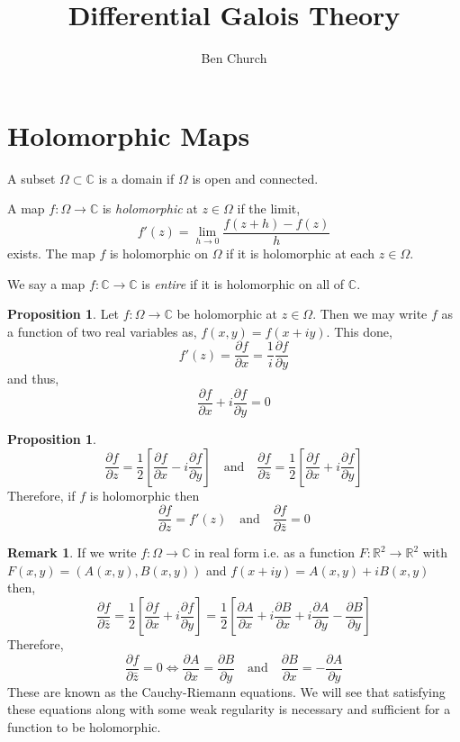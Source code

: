 \documentclass[12pt]{extarticle}
\newcommand{\R}{\mathbb{R}}
\newcommand{\C}{\mathbb{C}}
\newcommand{\pderiv}[2]{\frac{\partial{#1}}{\partial{#2}}}
\theoremstyle{definition}
\newtheorem{proposition}[theorem]{Proposition}
\newtheorem{remark}{Remark}
\newenvironment{definition}[1][Definition:]{\begin{trivlist}
\item[\hskip \labelsep {\bfseries #1}]}{\end{trivlist}}
\begin{document}
\title{Differential Galois Theory}
\author{Ben Church}
\maketitle
\tableofcontents
\newpage

\section{Holomorphic Maps}

\begin{definition}
A subset $\Omega \subset \C$ is a domain if $\Omega$ is open and connected.
\end{definition}

\begin{definition}
A map $f : \Omega \to \C$ is \textit{holomorphic} at $z \in \Omega$ if the limit,
\[ f'(z) = \lim_{h \to 0} \frac{ f(z + h) - f(z) }{h} \]
exists. The map $f$ is holomorphic on $\Omega$ if it is holomorphic at each $z \in \Omega$. 
\end{definition}

\begin{definition}
We say a map $f : \C \to \C$ is \textit{entire} if it is holomorphic on all of $\C$.
\end{definition}

\begin{proposition}
Let $f : \Omega \to \C$ be holomorphic at $z \in \Omega$. Then we may write $f$ as a function of two real variables as, $f(x, y) = f(x + i y)$. This done,
\[ f'(z) = \pderiv{f}{x} = \frac{1}{i} \pderiv{f}{y} \]
and thus,
\[ \pderiv{f}{x} + i \pderiv{f}{y} = 0 \] 
\end{proposition}


\begin{proposition}
\[ \pderiv{f}{z} = \frac{1}{2} \left[ \pderiv{f}{x} - i \pderiv{f}{y} \right] \quad \text{and} \quad \pderiv{f}{\bar{z}} = \frac{1}{2} \left[ \pderiv{f}{x} + i \pderiv{f}{y} \right] \]
Therefore, if $f$ is holomorphic then 
\[ \pderiv{f}{z} = f'(z) \quad \text{and} \quad \pderiv{f}{\bar{z}} = 0 \]
\end{proposition}


\begin{remark}
If we write $f : \Omega \to \C$ in real form i.e. as a function $F : \R^2 \to \R^2$ with $F(x,y) = (A(x,y), B(x,y))$ and $f(x + iy) = A(x,y) + i B(x,y)$ then,
\[ \pderiv{f}{\bar{z}} = \frac{1}{2} \left[ \pderiv{f}{x} + i \pderiv{f}{y} \right] = \frac{1}{2} \left[ \pderiv{A}{x} + i \pderiv{B}{x} + i \pderiv{A}{y} - \pderiv{B}{y} \right] \]
Therefore,
\[ \pderiv{f}{\bar{z}} = 0 \iff \pderiv{A}{x} = \pderiv{B}{y} \quad \text{and} \quad \pderiv{B}{x} = - \pderiv{A}{y} \]
These are known as the Cauchy-Riemann equations. We will see that satisfying these equations along with some weak regularity is necessary and sufficient for a function to be holomorphic. 
\end{remark}
\end{document}
